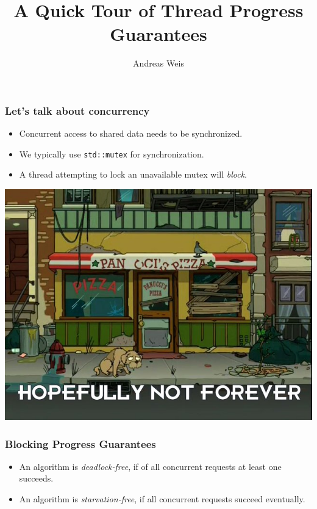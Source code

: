 \documentclass{beamer}
\title{A Quick Tour of Thread Progress Guarantees}
\author{Andreas Weis}
\institute{BMW AG}
\newif\iftransitions
\begin{document}
\frame{\titlepage}

\begin{frame}[fragile]
  \frametitle{Let's talk about concurrency}

  \begin{itemize}
\iftransitions \pause \fi
    \item Concurrent access to shared data needs to be synchronized.
\iftransitions \pause \fi
    \item We typically use \texttt{std::mutex} for synchronization.
\iftransitions \pause \fi
    \item A thread attempting to lock an unavailable mutex will \emph{block}.
  \end{itemize}

  \iftransitions \pause \fi
  \begin{center}
    \includegraphics[height=0.5\textheight]{resources/waiting.jpg}
  \end{center}
\end{frame}

\begin{frame}[fragile]
  \frametitle{Blocking Progress Guarantees}

  \begin{itemize}
    \setlength\itemsep{1.5em}

    \item An algorithm is \emph{deadlock-free}, if of all concurrent requests at least one succeeds.

    \iftransitions \pause \fi

    \item An algorithm is \emph{starvation-free}, if all concurrent requests succeed eventually.

  \end{itemize}
\end{frame}
\end{document}
